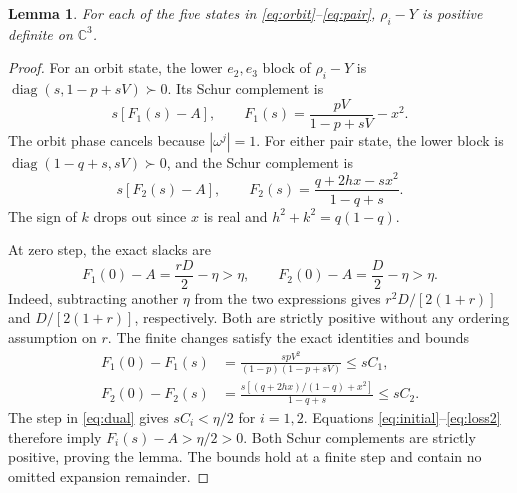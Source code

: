 \documentclass[11pt]{article}
\newtheorem{lemma}{Lemma}
\newcommand{\C}{\mathbb C}
\begin{document}
\begin{lemma}\label{lem:dual}
For each of the five states in \eqref{eq:orbit}--\eqref{eq:pair},
$\rho_i-Y$ is positive definite on $\C^3$.
\end{lemma}
\begin{proof}
For an orbit state, the lower $e_2,e_3$ block of $\rho_i-Y$ is
$\operatorname{diag}(s,1-p+sV)\succ0$. Its Schur complement is
\begin{equation}
 s[F_1(s)-A],\qquad F_1(s)=\frac{pV}{1-p+sV}-x^2.
 \label{eq:schur1}
\end{equation}
The orbit phase cancels because $|\omega^j|=1$.
For either pair state, the lower block is
$\operatorname{diag}(1-q+s,sV)\succ0$, and the Schur complement is
\begin{equation}
 s[F_2(s)-A],\qquad
 F_2(s)=\frac{q+2hx-sx^2}{1-q+s}.
 \label{eq:schur2}
\end{equation}
The sign of $k$ drops out since $x$ is real and
$h^2+k^2=q(1-q)$.

At zero step, the exact slacks are
\begin{equation}
 F_1(0)-A=\frac{rD}{2}-\eta>\eta,\qquad
 F_2(0)-A=\frac{D}{2}-\eta>\eta.
 \label{eq:initial}
\end{equation}
Indeed, subtracting another $\eta$ from the two expressions gives
$r^2D/[2(1+r)]$ and $D/[2(1+r)]$, respectively.
Both are strictly positive without any ordering assumption on $r$.
The finite changes satisfy the exact identities and bounds
\begin{align}
 F_1(0)-F_1(s)
   &=\frac{spV^2}{(1-p)(1-p+sV)}\leq sC_1,
       \label{eq:loss1}\\
 F_2(0)-F_2(s)
   &=\frac{s[(q+2hx)/(1-q)+x^2]}{1-q+s}\leq sC_2.
       \label{eq:loss2}
\end{align}
The step in \eqref{eq:dual} gives $sC_i<\eta/2$ for
$i=1,2$. Equations \eqref{eq:initial}--\eqref{eq:loss2}
therefore imply $F_i(s)-A>\eta/2>0$.
Both Schur complements are strictly positive, proving the lemma.
The bounds hold at a finite step and contain no omitted expansion
remainder.
\end{proof}
\end{document}
